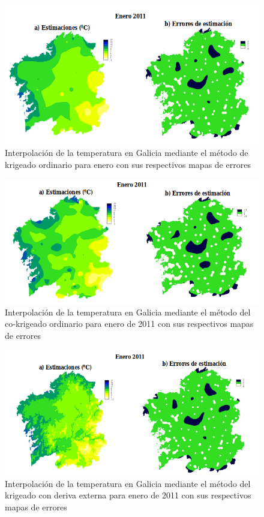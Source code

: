 \begin{figure}
    \centering
    \includegraphics[scale=0.6]{proyectos/proyecto_geoestadistica_croacia/images/ea_galicia_ko.png}
    \caption{Interpolación de la temperatura en Galicia mediante el método de krigeado ordinario para enero con sus respectivos mapas de errores}
    \label{ea_galicia_ko}
\end{figure}


\begin{figure}
    \centering
    \includegraphics[scale=0.6]{proyectos/proyecto_geoestadistica_croacia/images/ea_galicia_coko.png}
    \caption{Interpolación  de  la  temperatura  en  Galicia  mediante  el  método  del  co-krigeado  ordinario  para  enero de  2011  con  sus  respectivos  mapas  de  errores}
    \label{ea_galicia_coko}
\end{figure}

\begin{figure}
    \centering
    \includegraphics[scale=0.6]{proyectos/proyecto_geoestadistica_croacia/images/ea_galicia_kde.png}
    \caption{ Interpolación de la temperatura en Galicia mediante el método del krigeado con  deriva  externa  para  enero de  2011  con  sus  respectivos  mapas  de  errores}
    \label{ea_galicia_kde}
\end{figure}

